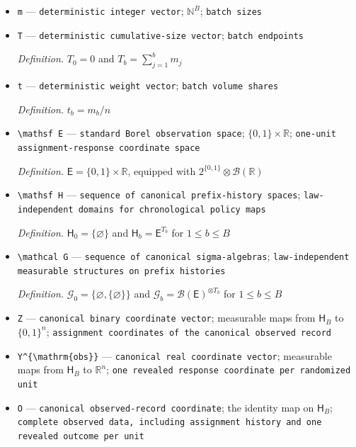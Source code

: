 \documentclass{article}
\begin{document}
\begin{itemize}
  \par\smallskip\noindent\emph{Definition.} \(\tau=\mu_1-\mu_0\)
  \item \texttt{m} --- \texttt{deterministic integer vector}; \(\mathbb N^B\); \texttt{batch sizes}
  \item \texttt{T} --- \texttt{deterministic cumulative-\allowbreak{}size vector}; \texttt{batch endpoints}
  \par\smallskip\noindent\emph{Definition.} \(T_0=0\) and \(T_b=\sum_{j=1}^b m_j\)
  \item \texttt{t} --- \texttt{deterministic weight vector}; \texttt{batch volume shares}
  \par\smallskip\noindent\emph{Definition.} \(t_b=m_b/n\)
  \item \texttt{\textbackslash{}\allowbreak{}mathsf E} --- \texttt{standard Borel observation space}; \(\{0,1\}\times\mathbb R\); \texttt{one-\allowbreak{}unit assignment-\allowbreak{}response coordinate space}
  \par\smallskip\noindent\emph{Definition.} \(\mathsf E=\{0,1\}\times\mathbb R\), equipped with \(2^{\{0,1\}}\otimes\mathcal B(\mathbb R)\)
  \item \texttt{\textbackslash{}\allowbreak{}mathsf H} --- \texttt{sequence of canonical prefix-\allowbreak{}history spaces}; \texttt{law-\allowbreak{}independent domains for chronological policy maps}
  \par\smallskip\noindent\emph{Definition.} \(\mathsf H_0=\{\varnothing\}\) and \(\mathsf H_b=\mathsf E^{T_b}\) for \(1\le b\le B\)
  \item \texttt{\textbackslash{}\allowbreak{}mathcal G} --- \texttt{sequence of canonical sigma-\allowbreak{}algebras}; \texttt{law-\allowbreak{}independent measurable structures on prefix histories}
  \par\smallskip\noindent\emph{Definition.} \(\mathcal G_0=\{\varnothing,\{\varnothing\}\}\) and \(\mathcal G_b=\mathcal B(\mathsf E)^{\otimes T_b}\) for \(1\le b\le B\)
  \item \texttt{Z} --- \texttt{canonical binary coordinate vector}; measurable maps from \(\mathsf H_B\) to \(\{0,1\}^n\); \texttt{assignment coordinates of the canonical observed record}
  \item \texttt{Y\textasciicircum{}\{\textbackslash{}\allowbreak{}mathrm\{obs\}\allowbreak{}\}\allowbreak{}} --- \texttt{canonical real coordinate vector}; measurable maps from \(\mathsf H_B\) to \(\mathbb R^n\); \texttt{one revealed response coordinate per randomized unit}
  \item \texttt{O} --- \texttt{canonical observed-\allowbreak{}record coordinate}; the identity map on \(\mathsf H_B\); \texttt{complete observed data,\allowbreak{} including assignment history and one revealed outcome per unit}

\end{itemize}
\end{document}

